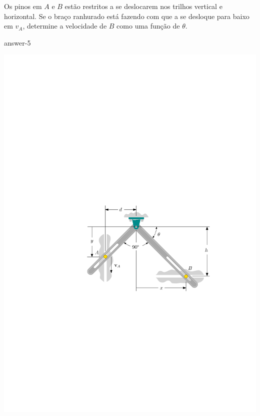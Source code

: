 \item Os pinos em $A$ e $B$ estão restritos a se deslocarem nos trilhos vertical e horizontal. Se o braço ranhurado
está fazendo com que a se desloque para baixo em $v_{A}$, determine a velocidade de $B$ como uma função de $\theta$.

{answer-5}

\vspace{-1.8cm}
\begin{flushright}
	\includegraphics[scale=1]{images/draw_9}
\end{flushright}